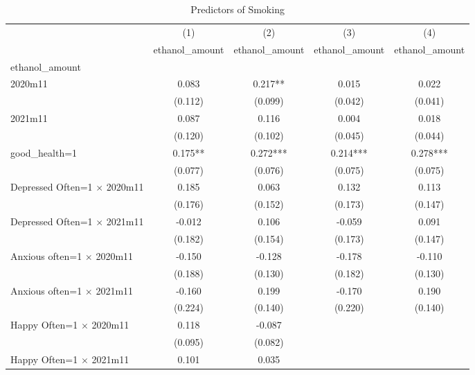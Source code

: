 \begin{table}[htbp]\centering
\def\sym#1{\ifmmode^{#1}\else\(^{#1}\)\fi}
\caption{Predictors of Smoking}
\begin{tabular}{l*{4}{c}}
\toprule
                &\multicolumn{1}{c}{(1)}&\multicolumn{1}{c}{(2)}&\multicolumn{1}{c}{(3)}&\multicolumn{1}{c}{(4)}\\
                &\multicolumn{1}{c}{ethanol\_amount}&\multicolumn{1}{c}{ethanol\_amount}&\multicolumn{1}{c}{ethanol\_amount}&\multicolumn{1}{c}{ethanol\_amount}\\
\midrule
ethanol\_amount  &            &            &            &            \\
2020m11         &    0.083   &    0.217** &    0.015   &    0.022   \\
                &  (0.112)   &  (0.099)   &  (0.042)   &  (0.041)   \\
2021m11         &    0.087   &    0.116   &    0.004   &    0.018   \\
                &  (0.120)   &  (0.102)   &  (0.045)   &  (0.044)   \\
good\_health=1   &    0.175** &    0.272***&    0.214***&    0.278***\\
                &  (0.077)   &  (0.076)   &  (0.075)   &  (0.075)   \\
Depressed Often=1 $\times$ 2020m11&    0.185   &    0.063   &    0.132   &    0.113   \\
                &  (0.176)   &  (0.152)   &  (0.173)   &  (0.147)   \\
Depressed Often=1 $\times$ 2021m11&   -0.012   &    0.106   &   -0.059   &    0.091   \\
                &  (0.182)   &  (0.154)   &  (0.173)   &  (0.147)   \\
Anxious often=1 $\times$ 2020m11&   -0.150   &   -0.128   &   -0.178   &   -0.110   \\
                &  (0.188)   &  (0.130)   &  (0.182)   &  (0.130)   \\
Anxious often=1 $\times$ 2021m11&   -0.160   &    0.199   &   -0.170   &    0.190   \\
                &  (0.224)   &  (0.140)   &  (0.220)   &  (0.140)   \\
Happy Often=1 $\times$ 2020m11&    0.118   &   -0.087   &            &            \\
                &  (0.095)   &  (0.082)   &            &            \\
Happy Often=1 $\times$ 2021m11&    0.101   &    0.035   &            &            \\

\end{tabular}
\end{table}
